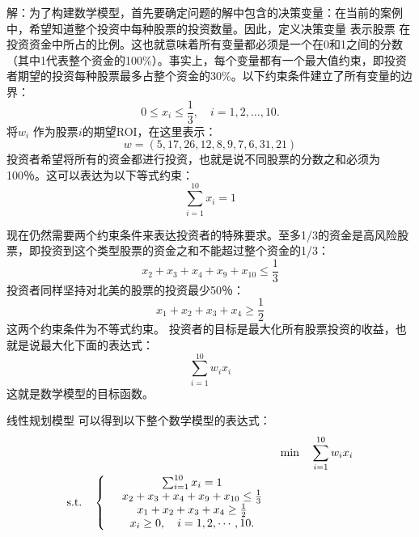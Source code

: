 \begin{frame}{\secname}
    解：为了构建数学模型，首先要确定问题的解中包含的决策变量：在当前的案例中，希望知道整个投资中每种股票的投资数量。因此，定义决策变量 表示股票 在投资资金中所占的比例。这也就意味着所有变量都必须是一个在0和1之间的分数（其中1代表整个资金的100\%）。事实上，每个变量都有一个最大值约束，即投资者期望的投资每种股票最多占整个资金的30\%。以下约束条件建立了所有变量的边界：
$$
0 \le x_i \le \frac{1}{3}, \quad i=1,2,\dots, 10.
$$
将$w_i$ 作为股票$i$的期望ROI，在这里表示：
$$
w=(5,17,26,12,8,9,7,6,31,21)
$$
投资者希望将所有的资金都进行投资，也就是说不同股票的分数之和必须为100％。这可以表达为以下等式约束：
$$
\sum_{i=1}^{10} x_i =1
$$
\end{frame}

\begin{frame}{\subsecname}
现在仍然需要两个约束条件来表达投资者的特殊要求。至多1/3的资金是高风险股票，即投资到这个类型股票的资金之和不能超过整个资金的1/3：
$$
x_2+x_3+x_4+x_9+x_{10} \le \frac{1}{3}
$$
投资者同样坚持对北美的股票的投资最少50％：
$$
x_1+x_2+x_3+x_4 \ge \frac{1}{2}
$$
这两个约束条件为不等式约束。
    投资者的目标是最大化所有股票投资的收益，也就是说最大化下面的表达式：
$$
\sum_{i=1}^{10} w_ix_i
$$
这就是数学模型的目标函数。
\end{frame}

\begin{frame}{\subsecname}
\begin{block}{线性规划模型}
可以得到以下整个数学模型的表达式：
\begin{alignat}{2}
&&\min\quad   \sum_{i=1}^{10} w_i x_i \\
\mbox{s.t.}\quad
\left\{
\begin{array}{cc}
     & \sum_{i=1}^{10} x_i =1 \\
     & x_2+x_3+x_4+x_9+x_{10} \le \frac{1}{3}\\
     & x_1+x_2+x_3+x_4 \ge \frac{1}{2} \\
     & x_i \ge 0, \quad i=1,2,\cdots, 10.
\end{array}
\right.
\end{alignat}
\end{block}
\end{frame}

